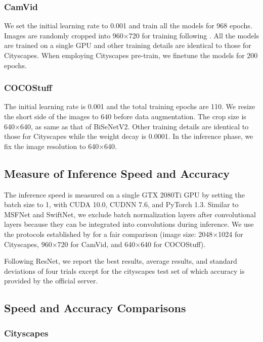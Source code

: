 \documentclass[journal]{IEEEtran}
\begin{document}
\subsubsection{CamVid}

We set the initial learning rate to 0.001 and train all the models for 968 epochs. Images are randomly cropped into 960$\times$720 for training following \cite{li2019dfanet}. All the models are trained on a single GPU and other training details are identical to those for Cityscapes. When employing Cityscapes pre-train, we finetune the models for 200 epochs.

\subsubsection{COCOStuff}

The initial learning rate is 0.001 and the total training epochs are 110. We resize the short side of the images to 640 before data augmentation. The crop size is 640$\times$640, as same as that of BiSeNetV2\cite{yu2020bisenet}. Other training details are identical to those for Cityscapes while the weight decay is 0.0001. In the inference phase, we fix the image resolution to 640$\times$640.

\subsection{Measure of Inference Speed and Accuracy}

The inference speed is measured on a single GTX 2080Ti GPU by setting the batch size to 1, with CUDA 10.0, CUDNN 7.6, and PyTorch 1.3. Similar to MSFNet and SwiftNet, we exclude batch normalization layers after convolutional layers because they can be integrated into convolutions during inference. We use the protocols established by \cite{chen2019fasterseg} for a fair comparison (image size: 2048$\times$1024 for Cityscapes, 960$\times$720 for CamVid, and 640$\times$640 for COCOStuff).

Following ResNet\cite{he2016deep}, we report the best results, average results, and standard deviations of four trials except for the cityscapes test set of which accuracy is provided by the official server.

\subsection{Speed and Accuracy Comparisons}

\subsubsection{Cityscapes}
\end{document}
